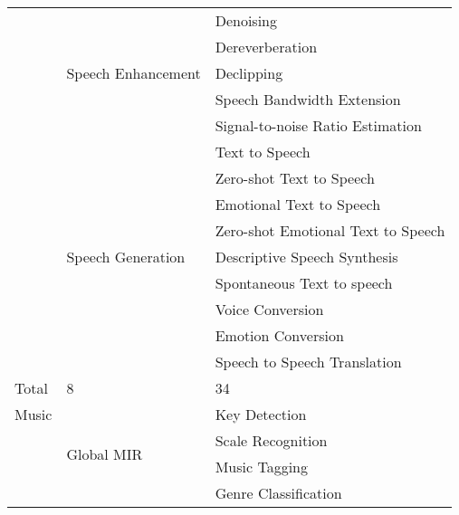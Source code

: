 \begin{longtable}{p{1.5cm}p{6cm}p{7cm}}
                            & \multirow{5}{*}{Speech Enhancement}    & Denoising     \\
                            &                        & Dereverberation               \\
                            &                        & Declipping                    \\
                            &                        & Speech Bandwidth Extension        \\
                            &                        & Signal-to-noise Ratio Estimation  \\
                            \cline{2-3} %
                            & \multirow{9}{*}{Speech Generation}     & Text to Speech        \\  %
                            &                        & Zero-shot Text to Speech              \\  %
                            &                        & Emotional Text to Speech              \\  %
                            &                        & Zero-shot Emotional Text to Speech    \\  %
                            &                        & Descriptive Speech Synthesis          \\  %
                            &                        & Spontaneous Text to speech            \\  %
                            &                        & Voice Conversion                      \\  %
                            &                        & Emotion Conversion                    \\  %
                            &                        & Speech to Speech Translation          \\  %
                            \cline{2-3} %
     \cline{2-3}
    Total & 8 & 34  \\  %
    \midrule
    Music & \multirow{10}{*}{Global MIR} & Key Detection \\
                           \multirow{27}{*}{} &             & Scale Recognition                    \\ 
                           &             & Music Tagging                        \\ 
                           &             & Genre Classification                 \\ 

\end{longtable}
